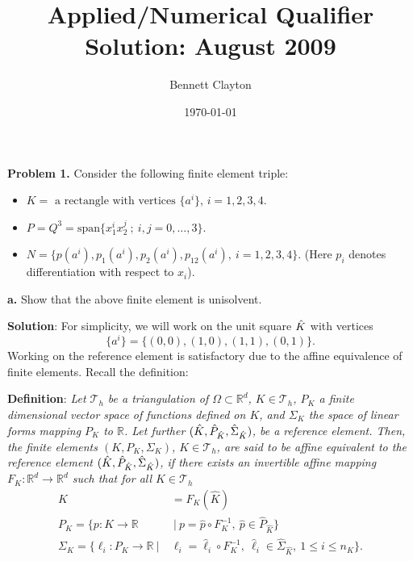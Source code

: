 \documentclass[11pt]{article}
\title{Applied/Numerical Qualifier Solution: August 2009}
\author{Bennett Clayton}
\affil{Texas A\&M University}
\date{\today}
\begin{document}
\maketitle

{\bf Problem 1.} Consider the following finite element triple:
\begin{itemize}
    \item $K = \text{ a rectangle with vertices } \{a^i\}$, $i = 1, 2, 3, 4$.
    \item $P = Q^3 = \text{span}\{x^i_1x^j_2 \: ; \: i, j= 0, \ldots, 3 \}$. 
    \item $N = \{ p(a^i), p_1(a^i), p_2(a^i), p_{12}(a^i), \:  i= 1,2,3,4 \}$. (Here $p_i$ denotes differentiation with respect to $x_i$).
\end{itemize}

\vskip 1cm

{\bf a.} Show that the above finite element is unisolvent.

\vskip 1cm

\textbf{Solution}: For simplicity, we will work on the unit square $\Hat{K}$ with vertices 
\begin{equation*}
    \{a^i\} = \{(0,0), (1,0), (1,1), (0,1) \}.
\end{equation*}
Working on the reference element is satisfactory due to the affine equivalence of finite elements.
Recall the definition:

\textbf{Definition}: \textit{Let $\mathcal{T}_h$ be a triangulation of $\Omega \subset \mathbb{R}^d$, $K \in \mathcal{T}_h$, $P_K$ a finite dimensional vector space of functions defined on $K$, and $\Sigma_K$ the space of linear forms mapping $P_K$ to $\mathbb{R}$. 
Let further $(\hat{K}, \Hat{P}_{\hat{K}}, \hat{\Sigma}_{\hat{K}})$, be a reference element. 
Then, the finite elements $(K, P_K, \Sigma_K)$, $K \in \mathcal{T}_h$, are said to be affine equivalent to the reference element $(\hat{K}, \Hat{P}_{\hat{K}}, \hat{\Sigma}_{\hat{K}})$, if there exists an invertible affine mapping $F_K : \mathbb{R}^d \to \mathbb{R}^d$ such that for all $K \in \mathcal{T}_h$ 
\begin{align}
    K &= F_K(\hat{K}) \\ 
    P_K = \{ p : K\to\mathbb{R} &\: | \: p = \hat{p} \circ F_K^{-1}, \: \hat{p} \in \hat{P}_{\hat{K}} \} \\
    \Sigma_K = \{ \ell_i : P_K \to \mathbb{R} \: | \: &\ell_i = \hat{\ell}_i \circ F_K^{-1}, \: \hat{\ell}_i \in \hat{\Sigma}_{\hat{K}}, \: 1 \leq i \leq n_K \}.
\end{align}}
\end{document}
